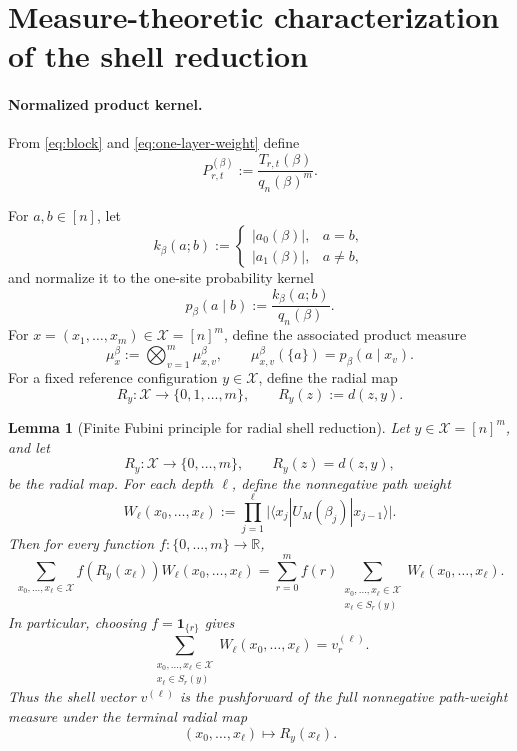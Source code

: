 \documentclass[a4paper,onecolumn,11pt,unpublished]{quantumarticle}
\newtheorem{lemma}[theorem]{Lemma}
\theoremstyle{remark}
\newcommand{\sh}[1]{{\color{teal}#1}}
\begin{document}
\section{Measure-theoretic characterization of the shell reduction}
\label{app:measure-shell-reduction}




\paragraph{Normalized product kernel.}

From \cref{eq:block} and \cref{eq:one-layer-weight} define
\[
P_{r,t}^{(\beta)}:=\frac{T_{r,t}(\beta)}{q_n(\beta)^m}.
\]



For \(a,b\in[n]\), let
\[
k_\beta(a;b)
:=
\begin{cases}
|a_0(\beta)|, & a=b,\\[2mm]
|a_1(\beta)|, & a\neq b,
\end{cases}
\]
and normalize it to the one-site probability kernel
\[
p_\beta(a\mid b):=\frac{k_\beta(a;b)}{q_n(\beta)}.
\]
For \(x=(x_1,\dots,x_m)\in \mathcal X=[n]^m\), define the associated product measure
\[
\mu_x^\beta
:=
\bigotimes_{v=1}^{m}\mu_{x,v}^\beta,
\qquad
\mu_{x,v}^\beta(\{a\})=p_\beta(a\mid x_v).
\]
For a fixed reference configuration \(y\in \mathcal X\), define the radial map
\[
R_y:\mathcal X\to\{0,1,\dots,m\},
\qquad
R_y(z):=d(z,y).
\]




\begin{lemma}[Finite Fubini principle for radial shell reduction]
\label{lem:fubini-radial-shell}
Let \(y\in \mathcal X=[n]^m\), and let
\[
R_y:\mathcal X\to\{0,\dots,m\},
\qquad
R_y(z)=d(z,y),
\]
be the radial map. For each depth \(\ell\), define the nonnegative path weight
\[
W_\ell(x_0,\dots,x_\ell)
:=
\prod_{j=1}^{\ell}
\bigl|\langle x_j|U_M(\beta_j)|x_{j-1}\rangle\bigr|.
\]
Then for every function \(f:\{0,\dots,m\}\to\mathbb R\),
\begin{equation}
\label{eq:fubini-radial-shell}
\sum_{x_0,\dots,x_\ell\in \mathcal X}
f\!\left(R_y(x_\ell)\right)
W_\ell(x_0,\dots,x_\ell)
=
\sum_{r=0}^{m}
f(r)
\sum_{\substack{x_0,\dots,x_\ell\in \mathcal X\\ x_\ell\in S_r(y)}}
W_\ell(x_0,\dots,x_\ell).
\end{equation}
In particular, choosing \(f=\mathbf 1_{\{r\}}\) gives
\[
\sum_{\substack{x_0,\dots,x_\ell\in \mathcal X\\ x_\ell\in S_r(y)}}
W_\ell(x_0,\dots,x_\ell)
=
v_r^{(\ell)}.
\]
Thus the shell vector \(v^{(\ell)}\) is the pushforward of the full
nonnegative path-weight measure under the terminal radial map
\[
(x_0,\dots,x_\ell)\longmapsto R_y(x_\ell).
\]
\end{lemma}
\end{document}
